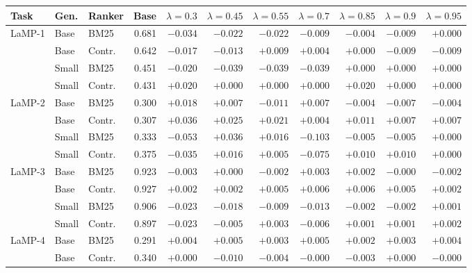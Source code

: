 \documentclass[10pt]{article}
\begin{document}
\begin{table}[p]
\centering
\tiny
\begin{tabular}{@{}lllrrrrrrrr@{}}
\toprule
Task & Gen. & Ranker & Base & $\lambda{=}0.3$ & $\lambda{=}0.45$ & $\lambda{=}0.55$ & $\lambda{=}0.7$ & $\lambda{=}0.85$ & $\lambda{=}0.9$ & $\lambda{=}0.95$ \\
\midrule
\multirow{4}{*}{LaMP-1} & Base & BM25 & 0.681 & $-0.034$ & $-0.022$ & $-0.022$ & $-0.009$ & $-0.004$ & $-0.009$ & $+0.000$ \\
\cmidrule(lr){2-11}
 & Base & Contr. & 0.642 & $-0.017$ & $-0.013$ & $+0.009$ & $+0.004$ & $+0.000$ & $-0.009$ & $-0.009$ \\
\cmidrule(lr){2-11}
 & Small & BM25 & 0.451 & $-0.020$ & $-0.039$ & $-0.039$ & $-0.039$ & $+0.000$ & $+0.000$ & $+0.000$ \\
\cmidrule(lr){2-11}
 & Small & Contr. & 0.431 & $+0.020$ & $+0.000$ & $+0.000$ & $+0.000$ & $+0.020$ & $+0.000$ & $+0.000$ \\
\midrule
\multirow{4}{*}{LaMP-2} & Base & BM25 & 0.300 & $+0.018$ & $+0.007$ & $-0.011$ & $+0.007$ & $-0.004$ & $-0.007$ & $-0.004$ \\
\cmidrule(lr){2-11}
 & Base & Contr. & 0.307 & $+0.036$ & $+0.025$ & $+0.021$ & $+0.004$ & $+0.011$ & $+0.007$ & $+0.007$ \\
\cmidrule(lr){2-11}
 & Small & BM25 & 0.333 & $-0.053$ & $+0.036$ & $+0.016$ & $-0.103$ & $-0.005$ & $-0.005$ & $+0.000$ \\
\cmidrule(lr){2-11}
 & Small & Contr. & 0.375 & $-0.035$ & $+0.016$ & $+0.005$ & $-0.075$ & $+0.010$ & $+0.010$ & $+0.000$ \\
\midrule
\multirow{4}{*}{LaMP-3} & Base & BM25 & 0.923 & $-0.003$ & $+0.000$ & $-0.002$ & $+0.003$ & $+0.002$ & $-0.000$ & $-0.002$ \\
\cmidrule(lr){2-11}
 & Base & Contr. & 0.927 & $+0.002$ & $+0.002$ & $+0.005$ & $+0.006$ & $+0.006$ & $+0.005$ & $+0.002$ \\
\cmidrule(lr){2-11}
 & Small & BM25 & 0.906 & $-0.023$ & $-0.018$ & $-0.009$ & $-0.013$ & $-0.002$ & $-0.002$ & $+0.001$ \\
\cmidrule(lr){2-11}
 & Small & Contr. & 0.897 & $-0.023$ & $-0.005$ & $+0.003$ & $-0.006$ & $+0.001$ & $+0.001$ & $+0.002$ \\
\midrule
\multirow{4}{*}{LaMP-4} & Base & BM25 & 0.291 & $+0.004$ & $+0.005$ & $+0.003$ & $+0.005$ & $+0.002$ & $+0.003$ & $+0.004$ \\
\cmidrule(lr){2-11}
 & Base & Contr. & 0.340 & $+0.000$ & $-0.010$ & $-0.004$ & $-0.000$ & $-0.003$ & $+0.000$ & $-0.000$ \\

\end{tabular}
\end{table}
\end{document}
